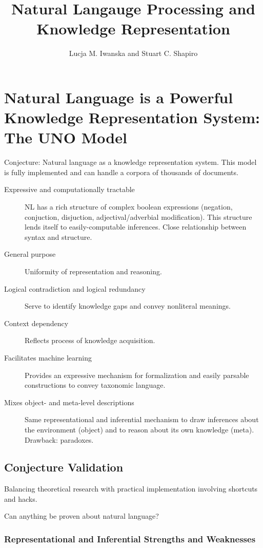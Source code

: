 \documentclass[11pt]{article}
\title{Natural Langauge Processing and Knowledge Representation}
\author{Lucja M. Iwanska and Stuart C. Shapiro}
\begin{document}
\maketitle

\section{Natural Language is a Powerful Knowledge Representation System: The UNO Model}

Conjecture: Natural language as a knowledge representation system. This model is fully implemented and can handle a corpora of thousands of documents.

\begin{description}
\item[Expressive and computationally tractable] NL has a rich structure of complex boolean expressions (negation, conjuction, disjuction, adjectival/adverbial modification).  This structure lends itself to easily-computable inferences.  Close relationship between syntax and structure.
\item[General purpose] Uniformity of representation and reasoning.
\item[Logical contradiction and logical redundancy] Serve to identify knowledge gaps and convey nonliteral meanings.
\item[Context dependency] Reflects process of knowledge acquisition.
\item[Facilitates machine learning] Provides an expressive mechanism for formalization and easily parsable constructions to convey taxonomic language.
\item[Mixes object- and meta-level descriptions] Same representational and inferential mechanism to draw inferences about the environment (object) and to reason about its own knowledge (meta).  Drawback: paradoxes.
\end{description}

\subsection{Conjecture Validation}

Balancing theoretical research with practical implementation involving shortcuts and hacks.

Can anything be proven about natural language?

\subsubsection{Representational and Inferential Strengths and Weaknesses}
\end{document}
